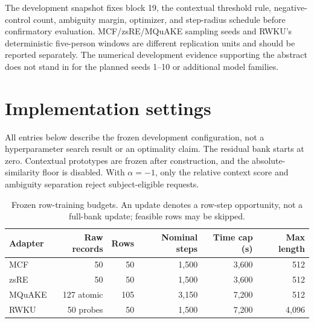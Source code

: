 \documentclass{article}
\newif\ifincludedevelopmentevidence
\begin{document}
The development snapshot fixes block 19, the contextual threshold rule,
negative-control count, ambiguity margin, optimizer, and step-radius schedule
before confirmatory evaluation. MCF/zsRE/MQuAKE sampling seeds and RWKU's
deterministic five-person windows are different replication units and should
be reported separately. The numerical development evidence supporting the
abstract\ifincludedevelopmentevidence
 is retained in Appendix~\ref{app:evidence} and\fi
 does not stand in for the planned seeds 1--10 or additional model families.


\appendix
\section{Implementation settings}
\label{app:settings}

All entries below describe the frozen development configuration, not a
hyperparameter search result or an optimality claim. The residual bank starts
at zero. Contextual prototypes are frozen after construction, and the
absolute-similarity floor is disabled. With $\alpha=-1$, only the relative context
score and ambiguity separation reject subject-eligible requests.

\begin{table}[ht]
\centering
\caption{Frozen row-training budgets. An update denotes a row-step opportunity,
not a full-bank update; feasible rows may be skipped.}
\label{tab:budgets}
\small
\begin{tabular}{@{}lrrrrr@{}}
\toprule
Adapter & Raw records & Rows & Nominal steps & Time cap (s) & Max length\\
\midrule
MCF & 50 & 50 & 1,500 & 3,600 & 512\\
zsRE & 50 & 50 & 1,500 & 3,600 & 512\\
MQuAKE & 127 atomic & 105 & 3,150 & 7,200 & 512\\
RWKU & 50 probes & 50 & 1,500 & 7,200 & 4,096\\
\bottomrule
\end{tabular}
\end{table}
\end{document}
